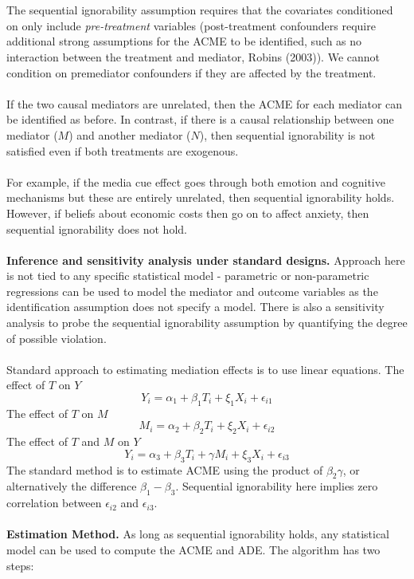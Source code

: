 \documentclass{article}
\begin{document}
	\\~\\
	The sequential ignorability assumption requires that the covariates conditioned on only include \textit{pre-treatment} variables (post-treatment confounders require additional strong assumptions for the ACME to be identified, such as no interaction between the treatment and mediator, Robins (2003)). We cannot condition on premediator confounders if they are affected by the treatment. 
	\\~\\
	If the two causal mediators are unrelated, then the ACME for each mediator can be identified as before. In contrast, if there is a causal relationship between one mediator ($M$) and another mediator ($N$), then sequential ignorability is not satisfied even if both treatments are exogenous. 
	\\~\\
	For example, if the media cue effect goes through both emotion and cognitive mechanisms but these are entirely unrelated, then sequential ignorability holds. However, if beliefs about economic costs then go on to affect anxiety, then sequential ignorability does not hold. 
	\\~\\
	\textbf{Inference and sensitivity analysis under standard designs.} Approach here is not tied to any specific statistical model - parametric or non-parametric regressions can be used to model the mediator and outcome variables as the identification assumption does not specify a model. There is also a sensitivity analysis to probe the sequential ignorability assumption by quantifying the degree of possible violation. 
	\\~\\
	Standard approach to estimating mediation effects is to use linear equations. The effect of $T$ on $Y$
	$$
	Y_i = \alpha_1 + \beta_1 T_i + \xi_1 X_i + \epsilon_{i1}
	$$
	The effect of $T$ on $M$
	$$
	M_i = \alpha_2 + \beta_2 T_i + \xi_2 X_i + \epsilon_{i2}
	$$
	The effect of $T$ and $M$ on $Y$
	$$
	Y_i = \alpha_3 + \beta_3 T_i + \gamma M_i + \xi_3 X_i + \epsilon_{i3}
	$$
	The standard method is to estimate ACME using the product of $\beta_2 \gamma$, or alternatively the difference $\beta_1 - \beta_3$. Sequential ignorability here implies zero correlation between $\epsilon_{i2}$ and $\epsilon_{i3}$. 
	\\~\\
	\textbf{Estimation Method.} As long as sequential ignorability holds, any statistical model can be used to compute the ACME and ADE. The algorithm has two steps:
\end{document}
